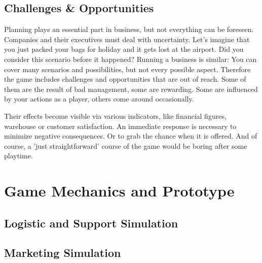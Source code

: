 \documentclass[11pt,titlepage,oneside,openany]{book}
\begin{document}
\section{Challenges \& Opportunities}
Planning plays an essential part in business, but not everything can be foreseen. Companies and their executives must deal with uncertainty. Let's imagine that you just packed your bags for holiday and it gets lost at the airport. Did you consider this scenario before it happened? Running a business is similar: You can cover many scenarios and possibilities, but not every possible aspect. Therefore the game includes challenges and opportunities that are out of reach. Some of them are the result of bad management, some are rewarding. Some are influenced by your actions as a player, others come around occasionally. 

Their effects become visible via various indicators, like financial figures, warehouse or customer satisfaction. An immediate response is necessary to minimize negative consequences. Or to grab the chance when it is offered. And of course, a 'just straightforward' course of the game would be boring after some playtime. 

\chapter{Game Mechanics and Prototype}
\label{cha:alg}














\section{Logistic and Support Simulation}



\section{Marketing Simulation}
\label{markting_simulation}





\end{document}
